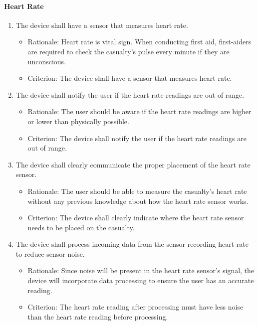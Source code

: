 \documentclass{article}
\begin{document}
        \paragraph{Heart Rate}
    \begin{enumerate}[label = \textbf{{FR7.}\arabic*} ]
	   \item The device shall have a sensor that measures heart rate.
            \begin{itemize}
                \item Rationale:  Heart rate is vital sign.  When conducting first aid, first-aiders are required to check the casualty's pulse every minute if they are unconscious. 
                \item Criterion: The device shall have a sensor that measures heart rate.
            \end{itemize}

        \item The device shall notify the user if the heart rate readings are out of range.
            \begin{itemize}
                \item Rationale: The user should be aware if the heart rate readings are higher or lower than physically possible.   
                \item Criterion: The device shall notify the user if the heart rate readings are out of range.
            \end{itemize}  

        \item The device shall clearly communicate the proper placement of the heart rate sensor.
            \begin{itemize}
                \item Rationale: The user should be able to measure the casualty's heart rate without any previous knowledge about how the heart rate sensor works. 
                \item Criterion: The device shall clearly indicate where the heart rate sensor needs to be placed on the casualty.
            \end{itemize}  

        \item The device shall process incoming data from the sensor recording heart rate to reduce sensor noise.
            \begin{itemize}
                \item Rationale:  Since noise will be present in the heart rate sensor's signal, the device will incorporate data processing to ensure the user has an accurate reading.
                \item Criterion: The heart rate reading after processing must have less noise than the heart rate reading before processing.
            \end{itemize}            
	        

\end{enumerate}
\end{document}

